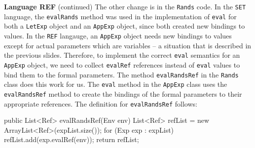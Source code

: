 \begin{minipage}[t]{\sw}
\slidenumber
\LARGE
{\bf Language REF} (continued)\exx
The other change is in the \verb'Rands' code.
In the \verb'SET' language,
the \verb'evalRands' method was used in
the implementation of \verb'eval'
for both a \verb'LetExp' object and an \verb'AppExp' object,
since both created new bindings to values.
In the \verb'REF' langauge, 
an \verb'AppExp' object needs new bindings to values
except for actual parameters which are variables --
a situation that is described in the previous slides.
Therefore, to implement the correct \verb'eval' semantics
for an \verb'AppExp' object,
we need to collect \verb'evalRef' references
instead of \verb'eval' values
to bind them to the formal parameters.
The method \verb'evalRandsRef' in the \verb'Rands' class
does this work for us.
The \verb'eval' method in the \verb'AppExp' class uses
the \verb'evalRandsRef' method
to create the bindings of the formal parameters
to their appropriate references.
The definition for \verb'evalRandsRef' follows:
{\Large
\begin{qv}
    public List<Ref> evalRandsRef(Env env) {
        List<Ref> refList = new ArrayList<Ref>(expList.size());
        for (Exp exp : expList)
            refList.add(exp.evalRef(env));
        return refList;
    }
\end{qv}
}
\end{minipage}
\clearpage
